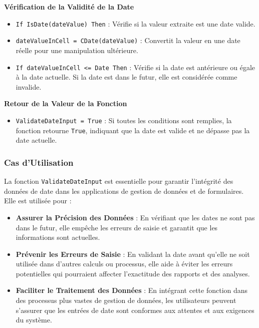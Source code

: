 \documentclass[a4paper, oneside, 12pt, final]{extreport}
\begin{document}
\textbf{Vérification de la Validité de la Date}

\begin{itemize}
    \item \texttt{If IsDate(dateValue) Then} : Vérifie si la valeur extraite est une date valide.
    \item \texttt{dateValueInCell = CDate(dateValue)} : Convertit la valeur en une date réelle pour une manipulation ultérieure.
    \item \texttt{If dateValueInCell <= Date Then} : Vérifie si la date est antérieure ou égale à la date actuelle. Si la date est dans le futur, elle est considérée comme invalide.
\end{itemize}

\textbf{Retour de la Valeur de la Fonction}

\begin{itemize}
    \item \texttt{ValidateDateInput = True} : Si toutes les conditions sont remplies, la fonction retourne \texttt{True}, indiquant que la date est valide et ne dépasse pas la date actuelle.
\end{itemize}

\subsubsection{Cas d'Utilisation}

La fonction \texttt{ValidateDateInput} est essentielle pour garantir l'intégrité des données de date dans les applications de gestion de données et de formulaires. Elle est utilisée pour :

\begin{itemize}
    \item \textbf{Assurer la Précision des Données} : En vérifiant que les dates ne sont pas dans le futur, elle empêche les erreurs de saisie et garantit que les informations sont actuelles.
    \item \textbf{Prévenir les Erreurs de Saisie} : En validant la date avant qu'elle ne soit utilisée dans d'autres calculs ou processus, elle aide à éviter les erreurs potentielles qui pourraient affecter l'exactitude des rapports et des analyses.
    \item \textbf{Faciliter le Traitement des Données} : En intégrant cette fonction dans des processus plus vastes de gestion de données, les utilisateurs peuvent s'assurer que les entrées de date sont conformes aux attentes et aux exigences du système.
\end{itemize}
\end{document}
